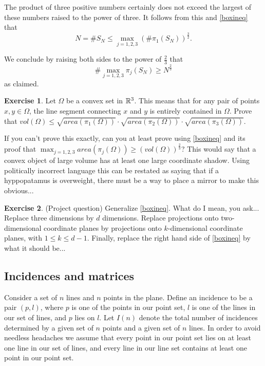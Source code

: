 \documentclass[]{amsart}
\numberwithin{equation}{section}
\theoremstyle{plain}
\theoremstyle{definition}
\newtheorem{exercise}{Exercise}[section]
\theoremstyle{remark}
\begin{document}
The product of three positive numbers certainly does not exceed the
largest of these numbers raised to the power of three. It follows from
this and \ref{boxineq} that
$$ N=\# S_N \leq \max_{j=1,2,3} {(\# \pi_1(S_N))}^{\frac{3}{2}}. $$

We conclude by raising both sides to the power of $\frac{2}{3}$ that
$$ \# \max_{j=1,2,3} \pi_j(S_N) \ge N^{\frac{2}{3}} $$ as
claimed.

\begin{exercise} Let $\Omega$ be a convex set in ${\Bbb R}^3$.
This means that for any pair of points $x,y \in \Omega$, the line segment
connecting $x$ and $y$ is entirely contained in $\Omega$. Prove that
$vol(\Omega) \leq \sqrt{area(\pi_1(\Omega))} \cdot
\sqrt{area(\pi_2(\Omega))} \cdot \sqrt{area(\pi_3(\Omega))}$. \end{exercise} 

If you can't prove this exactly, can you at least prove using \ref{boxineq}
and its proof that $\max_{j=1,2,3} area(\pi_j(\Omega)) \ge
{(vol(\Omega))}^{\frac{2}{3}}$? This would say that a convex object of
large volume has at least one large coordinate shadow. Using politically
incorrect language this can be restated as saying that if a hyppopatamus
is overweight, there must be a way to place a mirror to make this
obvious... 

\begin{exercise} (Project question) Generalize \ref{boxineq}. What do I
mean, you ask... Replace three dimensions by $d$ dimensions. Replace
projections onto two-dimensional coordinate planes by projections onto
$k$-dimensional coordinate planes, with $1 \leq k \leq d-1$. Finally,
replace the right hand side of \ref{boxineq} by what it should be...
\end{exercise}

\subsection{Incidences and matrices} Consider a set of $n$ lines
and $n$ points in the plane. Define an incidence to be a pair $(p,l)$,
where $p$ is one of the points in our point set, $l$ is one of the lines
in our set of lines, and $p$ lies on $l$. Let $I(n)$ denote the total
number of incidences determined by a given set of $n$ points and a given
set of $n$ lines. In order to avoid needless headaches we assume that
every point in our point set lies on at least one line in our set of
lines, and every line in our line set contains at least one point in our
point set.
\end{document}
